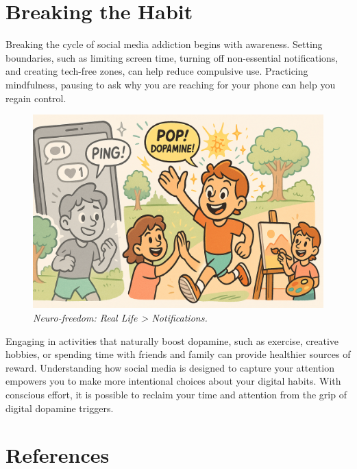 \documentclass[a4paper,10pt,twocolumn]{memoir}
\begin{document}
\section*{Breaking the Habit}

Breaking the cycle of social media addiction begins with awareness. Setting boundaries, such as limiting screen time, turning off non-essential notifications, and creating tech-free zones, can help reduce compulsive use. Practicing mindfulness, pausing to ask why you are reaching for your phone can help you regain control.
\begin{figure}[h!]
  \centering
  \includegraphics[width=0.9\linewidth]{pop.png}
  \caption*{\textit{Neuro-freedom: Real Life > Notifications.}}
\end{figure}
Engaging in activities that naturally boost dopamine, such as exercise, creative hobbies, or spending time with friends and family can provide healthier sources of reward. Understanding how social media is designed to capture your attention empowers you to make more intentional choices about your digital habits. With conscious effort, it is possible to reclaim your time and attention from the grip of digital dopamine triggers.

\section*{References}
\end{document}
